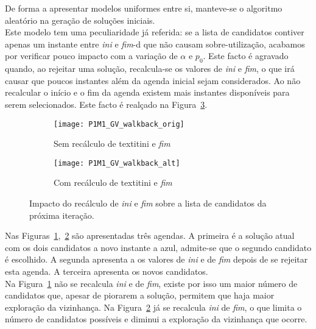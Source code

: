 De forma a apresentar modelos uniformes entre si, manteve-se o algoritmo aleatório na geração de soluções iniciais.\\

Este modelo tem uma peculiaridade já referida: se a lista de candidatos contiver apenas um instante entre \textit{ini} e \textit{fim}-d que não causam sobre-utilização, acabamos por verificar pouco impacto com a variação de $\alpha$ e $p_{0}$. Este facto é agravado quando, ao rejeitar uma solução, recalcula-se os valores de \textit{ini} e \textit{fim}, o que irá causar que poucos instantes além da agenda inicial sejam considerados. Ao não recalcular o início e o fim da agenda existem mais instantes disponíveis para serem selecionados. Este facto é realçado na Figura~\ref{fig:P1M1_GV_walkback}.\\
\begin{figure}[H]
	\centering
	\begin{subfigure}{0.49\textwidth}
	\centering
		\texttt{[image: P1M1\_GV\_walkback\_orig]}
		\caption{Sem recálculo de textit{ini} e \textit{fim}}
		\label{fig:P1M1_GV_walkback_orig}
	\end{subfigure}
	\begin{subfigure}{0.49\textwidth}
	\centering
		\texttt{[image: P1M1\_GV\_walkback\_alt]}
		\caption{Com recálculo de textit{ini} e \textit{fim}}
		\label{fig:P1M1_GV_walkback_alt}
	\end{subfigure}
	\caption{Impacto do recálculo de \textit{ini} e \textit{fim} sobre a lista de candidatos da próxima iteração.}
	\label{fig:P1M1_GV_walkback}
\end{figure}

Nas Figuras~\ref{fig:P1M1_GV_walkback_orig},~\ref{fig:P1M1_GV_walkback_alt} são apresentadas três agendas. A primeira é a solução atual com os dois candidatos a novo instante a azul, admite-se que o segundo candidato é escolhido. A segunda apresenta a os valores de \textit{ini} e de \textit{fim} depois de se rejeitar esta agenda. A terceira apresenta os novos candidatos.\\
Na Figura~\ref{fig:P1M1_GV_walkback_orig} não se recalcula \textit{ini} e de \textit{fim}, existe por isso um maior número de candidatos que, apesar de piorarem a solução, permitem que haja maior exploração da vizinhança. Na Figura~\ref{fig:P1M1_GV_walkback_alt} já se recalcula \textit{ini} de \textit{fim}, o que limita o número de candidatos possíveis e diminui a exploração da vizinhança que ocorre.\\

